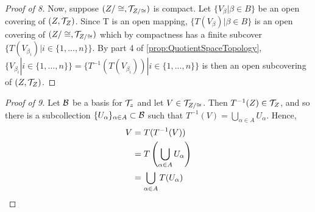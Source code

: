 \begin{prop}
\begin{proof}[Proof of 8]
         
         Now, suppose $(Z/\cong, \mathcal{T}_{Z/\cong})$ is compact. 
         Let $\{V_{\beta} | \beta \in B\}$ be an open covering of $(Z, \mathcal{T}_Z)$. 
         Since T is an open mapping, $\{T(V_{\beta}) | \beta \in B\}$ is an open covering of $(Z/\cong, \mathcal{T}_{Z/\cong})$ which by compactness has a finite subcover $\{T(V_{\beta_i}) | i \in \{1, ..., n\}\}$. 
         By part 4 of \ref{prop:QuotientSpaceTopology}, 
         $\{V_{\beta_i}| i \in \{1, ..., n\}\} = \{T^{-1}(T(V_{\beta_i})) |i \in \{1, ..., n\}\}$ is then an open subcovering of $(Z, \mathcal{T}_Z)$. 
    \end{proof}
    \begin{proof}[Proof of 9]
        Let $\mathcal{B}$ be a basis for $\mathcal{T}_z$ and let $V \in \mathcal{T}_{Z/\cong}$. 
        Then $T^{-1}(Z) \in \mathcal{T}_Z$, and so there is a subcollection $\{U_{\alpha}\}_{\alpha \in A} \subset \mathcal{B}$ such that $T^{-1}(V) = \bigcup_{\alpha \in A} U_{\alpha}$. 
        Hence, 
        \begin{align*}
            V& =T(T^{-1}(V))\\
            & = T\left( \bigcup_{\alpha \in A} U_{\alpha}\right)\\
            & = \bigcup_{\alpha \in A} T(U_{\alpha})
        \end{align*}
     \end{proof} 
\end{prop} 
